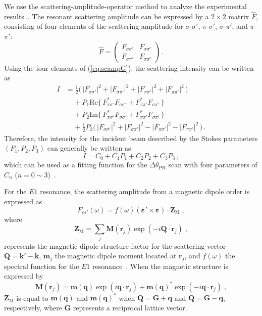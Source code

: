 \documentclass[aps,prb,reprint,superscriptaddress,amsmath,amssymb]{revtex4-2}
\begin{document}
We use the scattering-amplitude-operator method to analyze the experimental results~\cite{Lovesey96}. 
The resonant scattering amplitude can be expressed by a $2\times 2$ matrix $\hat{F}$, consisting of four elements of the scattering amplitude for 
$\sigma$-$\sigma'$, $\pi$-$\sigma'$, $\sigma$-$\pi'$, and $\pi$-$\pi'$:
\begin{equation}
\hat{F} = \begin{pmatrix} F_{\sigma\sigma'} & F_{\pi\sigma'} \\ 
F_{\sigma\pi'} & F_{\pi\pi'} \end{pmatrix}\,.
\label{eq:scampG}
\end{equation}
Using the four elements of (\ref{eq:scampG}), the scattering intensity can be written as 
\begin{align}
I &= 
\frac{1}{2} \bigl(\, |F_{\sigma\sigma'}|^2 + |F_{\sigma\pi'}|^2 + |F_{\pi\sigma'}|^2 + |F_{\pi\pi'}|^2 \,\bigr) \nonumber \\
 &\;\;\;\; + P_1 \text{Re} \bigl\{\, F_{\pi\sigma'}^*F_{\sigma\sigma'} + F_{\pi\pi'}^*F_{\sigma\pi'} \,\bigr\} \nonumber \\
 &\;\;\;\; + P_2 \text{Im} \bigl\{\, F_{\pi\sigma'}^*F_{\sigma\sigma'} + F_{\pi\pi'}^*F_{\sigma\pi'} \,\bigr\} 
 \label{eq:CrossSec1} \\
 &\;\;\;\; +  \frac{1}{2} P_3\bigl(\, |F_{\sigma\sigma'}|^2 + |F_{\sigma\pi'}|^2 - |F_{\pi\sigma'}|^2 - |F_{\pi\pi'}|^2 \,\bigr) 
 \,. \nonumber
\end{align}
Therefore, the intensity for the incident beam described by the Stokes parameters $(P_1, P_2, P_3)$ can generally be written as
\begin{equation}
I = C_0 + C_1 P_1 + C_2 P_2 + C_3 P_3 \,,
\label{eq:CrossSec2}
\end{equation}
which can be used as a fitting function for the $\Delta\theta_{\text{PR}}$ scan with four parameters of $C_n$ ($n=0\sim 3$)~\cite{Matsumura17}. 

For the $E1$ resonance, the scattering amplitude from a magnetic dipole order is expressed as   
\begin{equation}
F_{\varepsilon\varepsilon'}(\omega) =  f(\omega) ( \bm{\varepsilon}' \times \bm{\varepsilon}) \cdot   \bm{Z}_{\text{M}} \;, 
\label{eq:Freso}
\end{equation}
where
\begin{equation}
\bm{Z}_{\text{M}} = \sum_j \bm{M}(\bm{r}_j) \exp (-i \bm{Q}\cdot\bm{r}_j) \;, 
\end{equation}
represents the magnetic dipole structure factor for the scattering vector $\bm{Q} = \bm{k}' - \bm{k}$, $\bm{m}_j$ the magnetic dipole moment located at $\bm{r}_j$, and $f(\omega)$ the spectral function for the $E1$ resonance~\cite{Nagao05,Nagao06}. 
When the magnetic structure is expressed by  
\begin{equation}
\bm{M}(\bm{r}_j) = \bm{m}(\bm{q}) \exp (i\bm{q}\cdot \bm{r}_j) + \bm{m}(\bm{q})^{*} \exp (-i\bm{q} \cdot \bm{r}_j) \;, 
\label{eq:magr}
\end{equation}
$\bm{Z}_{\text{M}}$ is equal to $\bm{m}(\bm{q})$ and $\bm{m}(\bm{q})^{*}$ when $\bm{Q}=\bm{G}+\bm{q}$ and $\bm{Q}=\bm{G}-\bm{q}$, respectively, where $\bm{G}$ represents a reciprocal lattice vector. 
\end{document}
